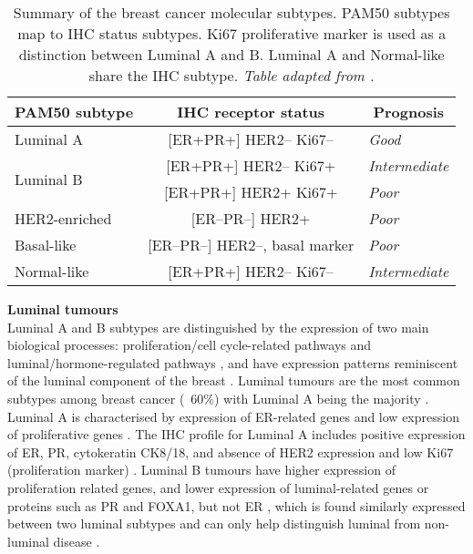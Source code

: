 \begin{table}[!h]
\centering
\caption[Summary of the breast cancer molecular subtypes and their IHC statuses.]{Summary of the breast cancer molecular subtypes. PAM50 subtypes map to IHC status subtypes. Ki67 proliferative marker is used as a distinction between Luminal A and B. Luminal A and Normal-like share the IHC subtype. \textit{Table adapted from \cite{Dai2015}.}}
\label{table:pam50summary}
\begin{tabular}{l|c|l}
\multicolumn{1}{c|}{\textbf{PAM50  subtype}} & \textbf{IHC receptor status} & \multicolumn{1}{c}{\textbf{Prognosis}} \\ \hline
\multicolumn{1}{|l|}{Luminal A} & {[}ER+PR+{]} HER2-- Ki67-- & \multicolumn{1}{l|}{\textit{Good}} \\ \hline
\multicolumn{1}{|l|}{\multirow{2}{*}{Luminal B}} & {[}ER+PR+{]} HER2-- Ki67+ & \multicolumn{1}{l|}{\textit{Intermediate}} \\ \cline{2-3} 
\multicolumn{1}{|l|}{} & {[}ER+PR+{]} HER2+ Ki67+ & \multicolumn{1}{l|}{\textit{Poor}} \\ \hline
\multicolumn{1}{|l|}{HER2-enriched} & {[}ER--PR--{]} HER2+ & \multicolumn{1}{l|}{\textit{Poor}} \\ \hline
\multicolumn{1}{|l|}{Basal-like} & {[}ER--PR--{]} HER2--, basal marker & \multicolumn{1}{l|}{\textit{Poor}} \\ \hline
\multicolumn{1}{|l|}{Normal-like} & {[}ER+PR+{]} HER2-- Ki67-- & \multicolumn{1}{l|}{\textit{Intermediate}} \\ \hline
\end{tabular}
\end{table}
    

\textbf{Luminal tumours}\\
Luminal A and B subtypes are distinguished by the expression of two main biological processes: proliferation/cell cycle-related pathways and luminal/hormone-regulated pathways \cite{Vidal2017}, and have expression patterns reminiscent of the luminal component of the breast \cite{perou2000molecular}. Luminal tumours are the most common subtypes among breast cancer (~60\%) with Luminal A being the majority \cite{Dai2015}.  Luminal A is characterised by expression of ER-related genes and low expression of proliferative genes \cite{eroles2012molecular}. The IHC profile for Luminal A includes positive expression of ER, PR, cytokeratin CK8/18, and absence of HER2 expression and low Ki67 (proliferation marker) \cite{Vidal2017}. Luminal B tumours have higher expression of proliferation related genes, and lower expression of luminal-related genes or proteins such as PR and FOXA1, but not ER \cite{prat2012prognostic}, which is found similarly expressed between two luminal subtypes and can only help distinguish luminal from non-luminal disease \cite{Vidal2017}.

